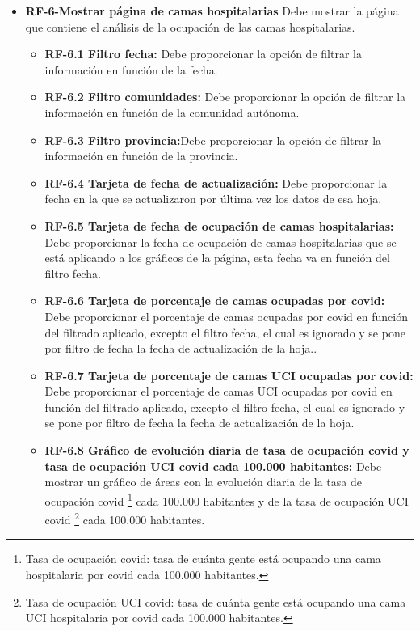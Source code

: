 \begin{itemize}
\begin{itemize}
    \end{itemize}
    \item \textbf{RF-6-Mostrar página de camas hospitalarias} Debe mostrar la página que contiene el análisis de la ocupación de las camas hospitalarias.
    \begin{itemize}
        \tightlist
            \item \textbf{RF-6.1 Filtro fecha:} Debe proporcionar la opción de filtrar la información en función de la fecha.
            \item \textbf{RF-6.2 Filtro comunidades:} Debe proporcionar la opción de filtrar la información en función de la comunidad autónoma.
            \item \textbf{RF-6.3 Filtro provincia:}Debe proporcionar la opción de filtrar la información en función de la provincia.
            \item \textbf{RF-6.4 Tarjeta de fecha de actualización:} Debe proporcionar la fecha en la que se actualizaron por última vez los datos de esa hoja.
            \item \textbf{RF-6.5 Tarjeta de fecha de ocupación de camas hospitalarias:} Debe proporcionar la fecha de ocupación de camas hospitalarias que se está aplicando a los gráficos de la página, esta fecha va en función del filtro fecha.
            \item \textbf{RF-6.6 Tarjeta de porcentaje de camas ocupadas por covid:} Debe proporcionar el porcentaje de camas ocupadas por covid en función del filtrado aplicado, excepto el filtro fecha, el cual es ignorado y se pone por filtro de fecha la fecha de actualización de la hoja..
            \item \textbf{RF-6.7 Tarjeta de porcentaje de camas UCI ocupadas por covid:} Debe proporcionar el porcentaje de camas UCI ocupadas por covid en función del filtrado aplicado, excepto el filtro fecha, el cual es ignorado y se pone por filtro de fecha la fecha de actualización de la hoja.
            \item \textbf{RF-6.8 Gráfico de evolución diaria de tasa de ocupación covid y tasa de ocupación UCI covid cada 100.000 habitantes:} Debe mostrar un gráfico de áreas con la evolución diaria de la tasa de ocupación covid \footnote{Tasa de ocupación covid: tasa de cuánta gente está ocupando una cama hospitalaria por covid cada 100.000 habitantes.} cada 100.000 habitantes y de la tasa de ocupación UCI covid \footnote{Tasa de ocupación UCI covid: tasa de cuánta gente está ocupando una cama UCI hospitalaria por covid cada 100.000 habitantes.} cada 100.000 habitantes.

\end{itemize}
\end{itemize}
